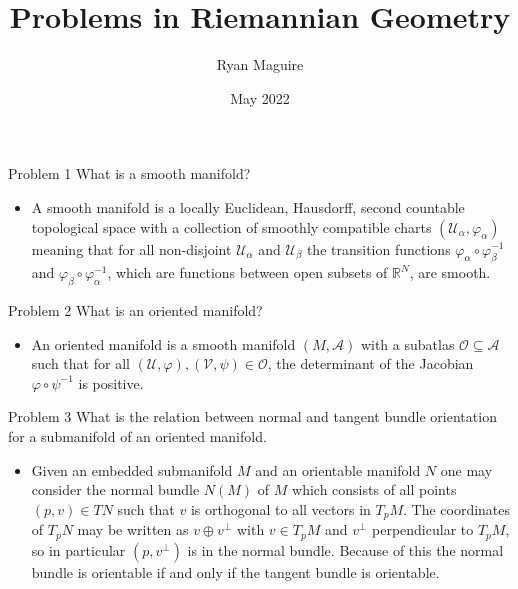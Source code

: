 \documentclass{beamer}
\title{Problems in Riemannian Geometry}
\author{Ryan Maguire}
\date{May 2022}
\begin{document}
    \maketitle
    \begin{frame}{Problem 1}
        What is a smooth manifold?
        \begin{itemize}
            \item A smooth manifold is a locally Euclidean, Hausdorff, second
                countable topological space with a collection of
                smoothly compatible charts $(\mathcal{U}_{\alpha},\varphi_{\alpha})$
                meaning that for all non-disjoint $\mathcal{U}_{\alpha}$ and
                $\mathcal{U}_{\beta}$ the transition functions
                $\varphi_{\alpha}\circ\varphi_{\beta}^{-1}$ and
                $\varphi_{\beta}\circ\varphi_{\alpha}^{-1}$, which are functions
                between open subsets of $\mathbb{R}^{N}$, are smooth.
        \end{itemize}
    \end{frame}
    \begin{frame}{Problem 2}
        What is an oriented manifold?
        \begin{itemize}
            \item An oriented manifold is a smooth manifold $(M,\mathcal{A})$
            with a subatlas $\mathcal{O}\subseteq\mathcal{A}$ such that for all
            $(\mathcal{U},\varphi),(\mathcal{V},\psi)\in\mathcal{O}$, the
            determinant of the Jacobian $\varphi\circ\psi^{-1}$ is positive.
        \end{itemize}
    \end{frame}
    \begin{frame}{Problem 3}
        What is the relation between normal and tangent bundle orientation for
        a submanifold of an oriented manifold.
        \begin{itemize}
            \item Given an embedded submanifold $M$ and an orientable manifold
                $N$ one may consider the normal bundle $N(M)$ of $M$ which
                consists of all points $(p,v)\in{T}N$ such that
                $v$ is orthogonal to all vectors in $T_{p}M$. The coordinates of
                $T_{p}N$ may be written as $v\oplus{v}^{\perp}$ with
                $v\in{T}_{p}M$ and $v^{\perp}$ perpendicular to $T_{p}M$, so
                in particular $(p,v^{\perp})$ is in the normal bundle. Because of
                this the normal bundle is orientable if and only if the tangent
                bundle is orientable.
        \end{itemize}
    \end{frame}
\end{document}
